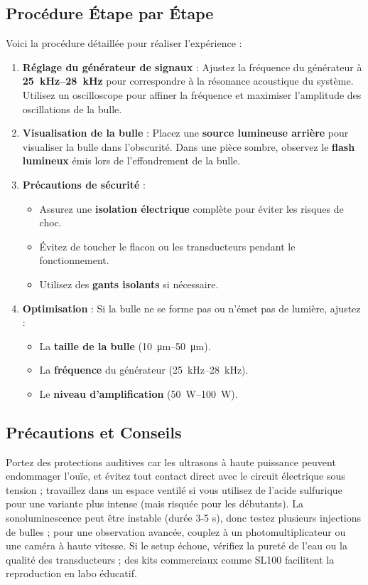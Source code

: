 \documentclass[a4paper,12pt]{article}
\begin{document}
\subsection{Procédure Étape par Étape}
Voici la procédure détaillée pour réaliser l'expérience :
\begin{enumerate}
    \item \textbf{Réglage du générateur de signaux} :
    Ajustez la fréquence du générateur à \textbf{\SIrange{25}{28}{\kilo\hertz}} pour correspondre à la résonance acoustique du système.
    Utilisez un oscilloscope pour affiner la fréquence et maximiser l'amplitude des oscillations de la bulle.

    \item \textbf{Visualisation de la bulle} :
    Placez une \textbf{source lumineuse arrière} pour visualiser la bulle dans l'obscurité.
    Dans une pièce sombre, observez le \textbf{flash lumineux} émis lors de l'effondrement de la bulle.

    \item \textbf{Précautions de sécurité} :
    \begin{itemize}
        \item Assurez une \textbf{isolation électrique} complète pour éviter les risques de choc.
        \item Évitez de toucher le flacon ou les transducteurs pendant le fonctionnement.
        \item Utilisez des \textbf{gants isolants} si nécessaire.
    \end{itemize}

    \item \textbf{Optimisation} :
    Si la bulle ne se forme pas ou n'émet pas de lumière, ajustez :
    \begin{itemize}
        \item La \textbf{taille de la bulle} (\SIrange{10}{50}{\micro\meter}).
        \item La \textbf{fréquence} du générateur (\SIrange{25}{28}{\kilo\hertz}).
        \item Le \textbf{niveau d'amplification} (\SIrange{50}{100}{\watt}).
    \end{itemize}
\end{enumerate}
\subsection{Précautions et Conseils}
Portez des protections auditives car les ultrasons à haute puissance peuvent endommager l'ouïe, et évitez tout contact direct avec le circuit électrique sous tension ; travaillez dans un espace ventilé si vous utilisez de l'acide sulfurique pour une variante plus intense (mais risquée pour les débutants). La sonoluminescence peut être instable (durée 3-5 s), donc testez plusieurs injections de bulles ; pour une observation avancée, couplez à un photomultiplicateur ou une caméra à haute vitesse. Si le setup échoue, vérifiez la pureté de l'eau ou la qualité des transducteurs ; des kits commerciaux comme SL100 facilitent la reproduction en labo éducatif.
\newpage
\end{document}
